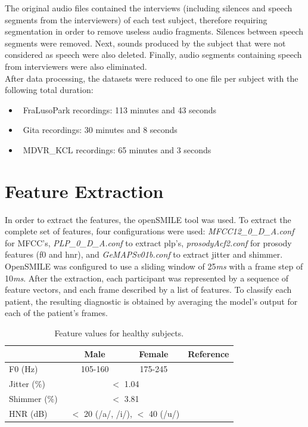 The original audio files contained the interviews (including silences and speech segments from the interviewers) of each test subject, therefore requiring segmentation in order to remove useless audio fragments. Silences between speech segments were removed. Next, sounds produced by the subject that were not considered as speech were also deleted. Finally, audio segments containing speech from interviewers were also eliminated.
\\
After data processing, the datasets were reduced to one file per subject with the following total duration:

\begin{itemize}
	\item ~FraLusoPark recordings: 113 minutes and 43 seconds
	\item ~Gita recordings: 30 minutes and 8 seconds
	\item ~MDVR\_KCL recordings: 65 minutes and 3 seconds

\end{itemize}

\section{Feature Extraction}

In order to extract the features, the openSMILE \cite{openSMILE} tool was used. To extract the complete set of features, four configurations were used: \textit{MFCC12\_0\_D\_A.conf} for MFCC's, \textit{PLP\_0\_D\_A.conf} to extract \gls{plp}'s, \textit{prosodyAcf2.conf} for prosody features (\gls{f0} and \gls{hnr}), and \textit{GeMAPSv01b.conf} to extract jitter and shimmer.
\\
OpenSMILE was configured to use a sliding window of 25\textit{ms} with a frame step of 10\textit{ms}. After the extraction, each participant was represented by a sequence of feature vectors, and each frame described by a list of features. To classify each patient, the resulting diagnostic is obtained by averaging the model's output for each of the patient's frames.

\begin{table}[!htb]
	\renewcommand{\arraystretch}{1.3} %
	\centering
	\begin{tabular}{lccc}
		\hline
		~       & Male & Female & Reference \\ \hline
		F0 (Hz)      & 105-160 & 175-245 & \cite{f0_values}\\ 
		Jitter (\%)  & \multicolumn{2}{c}{ $<$ 1.04  } & \cite{jitter_shimmer_values} \\ 
		Shimmer (\%) & \multicolumn{2}{c}{ $<$ 3.81 } & \cite{jitter_shimmer_values} \\
		HNR (dB)     & \multicolumn{2}{c}{ $<$ 20 (/a/, /i/), $<$ 40 (/u/) } & \cite{hnr_values} \\
		\hline
	\end{tabular}
	\caption[Feature values for healthy subjects.]{Feature values for healthy subjects.}
	\label{normalValues}
\end{table}

